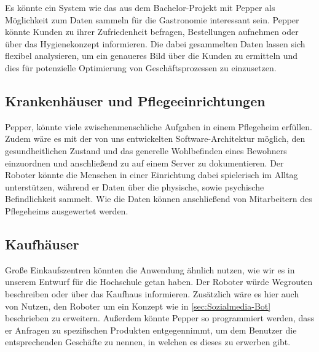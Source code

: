 Es könnte ein System wie das aus dem Bachelor-Projekt mit Pepper als Möglichkeit zum Daten sammeln für die Gastronomie interessant sein. Pepper könnte Kunden zu ihrer Zufriedenheit befragen, Bestellungen aufnehmen oder über das Hygienekonzept informieren. Die dabei gesammelten Daten lassen sich flexibel analysieren, um ein genaueres Bild über die Kunden zu ermitteln und dies für potenzielle Optimierung von Geschäftsprozessen zu einzusetzen.\\

\subsection{Krankenhäuser und Pflegeeinrichtungen}

Pepper, könnte viele zwischenmenschliche Aufgaben in einem Pflegeheim erfüllen. Zudem wäre es mit der von uns entwickelten Software-Architektur möglich, den gesundheitlichen Zustand und das generelle Wohlbefinden eines Bewohners einzuordnen und anschließend zu auf einem Server zu dokumentieren. Der Roboter könnte die Menschen in einer Einrichtung dabei spielerisch im Alltag unterstützen, während er Daten über die physische, sowie psychische Befindlichkeit sammelt. Wie die Daten können anschließend von Mitarbeitern des Pflegeheims ausgewertet werden.\\

\subsection{Kaufhäuser}

Große Einkaufszentren könnten die Anwendung ähnlich nutzen, wie wir es in unserem Entwurf für die Hochschule getan haben. Der Roboter würde Wegrouten beschreiben oder über das Kaufhaus informieren. Zusätzlich wäre es hier auch von Nutzen, den Roboter um ein Konzept wie in \ref{sec:Sozialmedia-Bot} beschrieben zu erweitern. Außerdem könnte Pepper so programmiert werden, dass er Anfragen zu spezifischen Produkten entgegennimmt, um dem Benutzer die entsprechenden Geschäfte zu nennen, in welchen es dieses zu erwerben gibt.\\

